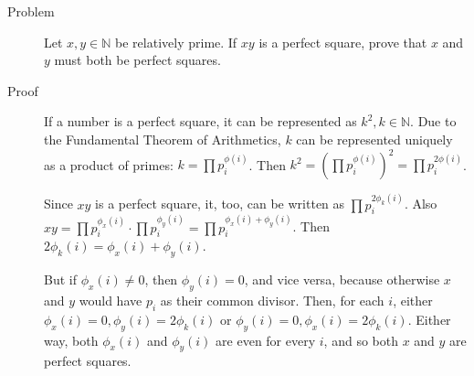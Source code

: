 \begin{description}
\item[Problem] Let $x, y \in \mathbb{N}$ be relatively prime. If $xy$ is a
perfect square, prove that $x$ and $y$ must both be perfect squares.

\item[Proof] If a number is a perfect square, it can be represented as $k^2,
k \in \mathbb{N}$. Due to the Fundamental Theorem of Arithmetics, $k$ can be
represented uniquely as a product of primes: $k = \prod p_i^{\phi(i)}$. Then
$k^2 = \left(\prod p_i^{\phi(i)}\right)^2 = \prod p_i^{2\phi(i)}$.

Since $xy$ is a perfect square, it, too, can be written as $\prod
p_{i}^{2\phi_k(i)}$. Also $xy = \prod p_i^{\phi_x(i)} \cdot \prod
p_i^{\phi_y(i)} = \prod p_i^{\phi_x(i) + \phi_y(i)}$. Then $2\phi_k(i) =
\phi_x(i) + \phi_y(i)$.

But if $\phi_x(i) \ne 0$, then $\phi_y(i) = 0$, and vice versa, because
otherwise $x$ and $y$ would have $p_i$ as their common divisor. Then, for each
$i$, either $\phi_x(i) = 0, \phi_y(i) = 2 \phi_k(i)$ or $\phi_y(i) = 0,
\phi_x(i) = 2 \phi_k(i)$. Either way, both $\phi_x(i)$ and $\phi_y(i)$ are
even for every $i$, and so both $x$ and $y$ are perfect squares.

\end{description}
